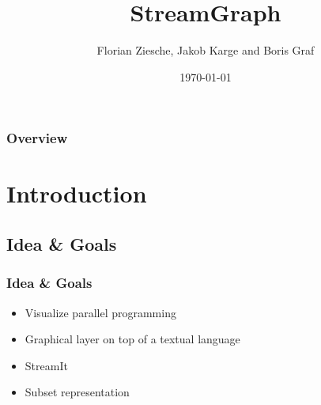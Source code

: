 \documentclass{beamer}
\title[StreamGraph]{StreamGraph} %
\author{Florian Ziesche, Jakob Karge and Boris Graf} %
\institute[TUB] %
{
Technische Universit\"at Berlin\\ %
}
\date{\today} %
\begin{document}
\begin{frame}
\titlepage %
\end{frame}

\begin{frame}
\frametitle{Overview} %
\tableofcontents %
\end{frame}


\section{Introduction} %
\subsection{Idea \& Goals}
\begin{frame}
\frametitle{Idea \& Goals}
\begin{itemize}
	\item Visualize parallel programming
	\item Graphical layer on top of a textual language
\end{itemize}
\begin{itemize}
	\item StreamIt
	\item Subset representation
\end{itemize}
\end{frame}
\end{document}
